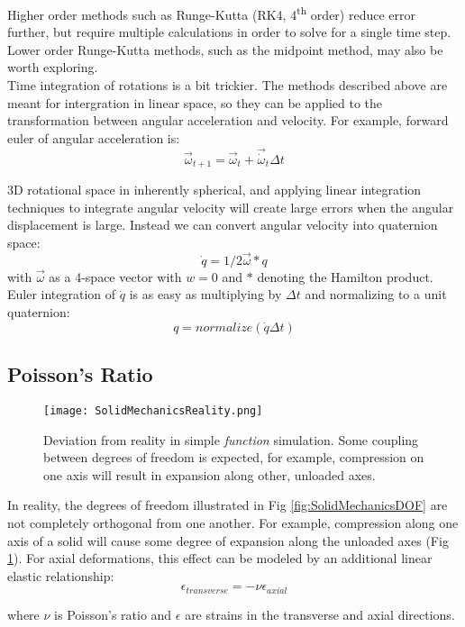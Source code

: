 {Higher order methods such as Runge-Kutta (RK4, 4\textsuperscript{th} order) reduce error further, but require multiple calculations in order to solve for a single time step.  Lower order Runge-Kutta methods, such as the midpoint method, may also be worth exploring.\\

Time integration of rotations is a bit trickier.  The methods described above are meant for intergration in linear space, so they can be applied to the transformation between angular acceleration and velocity.  For example, forward euler of angular acceleration is:
\[ \vec{\omega}_{t+1} = \vec{\omega}_{t} +  \vec{\dot{\omega}}_{t}\Delta t\]

3D rotational space in inherently spherical, and applying linear integration techniques to integrate angular velocity will create large errors when the angular displacement is large.  Instead we can convert angular velocity into quaternion space:
\[ \dot{q} = 1/2\vec{\omega}*q\]
with $\vec{\omega}$ as a 4-space vector with $w=0$ and $*$ denoting the Hamilton product.\\

Euler integration of $\dot{q}$ is as easy as multiplying by $\Delta t$ and normalizing to a unit quaternion:
\[ q = normalize(\dot{q}\Delta t)\]

\subsection{Poisson's Ratio}

\begin{figure}
  \texttt{[image: SolidMechanicsReality.png]}
  \caption{Deviation from reality in simple \textit{function} simulation.  Some coupling between degrees of freedom is expected, for example, compression on one axis will result in expansion along other, unloaded axes.}
  \label{fig:SolidMechanicsReality}
\end{figure}

In reality, the degrees of freedom illustrated in Fig \ref{fig:SolidMechanicsDOF} are not completely orthogonal from one another.  For example, compression along one axis of a solid will cause some degree of expansion along the unloaded axes (Fig \ref{fig:SolidMechanicsReality}).  For axial deformations, this effect can be modeled by an additional linear elastic relationship:
\[ \epsilon_{transverse} = -\nu \epsilon_{axial}\]

where $\nu$ is Poisson's ratio and $\epsilon$ are strains in the transverse and axial directions.\\

}

